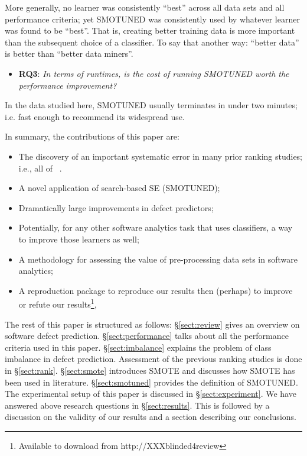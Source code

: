 \documentclass[10pt,conference]{IEEEtran}
\newcommand{\bi}{\begin{itemize}[leftmargin=0.4cm]}
\newcommand{\ei}{\end{itemize}}
\theoremstyle{break}
\theoremstyle{break}
\newcommand{\tion}[1]{{\S}\ref{sect:#1}}
\newcommand{\sma}{{\sc SMOTE}}
\newcommand{\smb}{{\sc SMOTUNED}}
\begin{document}
More generally, no learner was consistently ``best'' across all data sets and all performance criteria; yet {\smb} was consistently  used by  whatever  learner was found to be ``best''.  
That is,  creating better training data is more important
than the subsequent choice of a classifier.  To say that another way: ``better data'' is better than ``better data miners''.
 
  
   \bi
  \item
  \textbf{RQ3}: {\em  In terms of runtimes, is the cost of running {\smb} worth the performance improvement?}
  \ei
  
   \begin{lesson}In the data studied here,
   {\smb} usually terminates in under two minutes; i.e.  fast enough
   to recommend its widespread use.
 \end{lesson}


\newpage
\noindent
In summary, the  contributions of this paper are:
\bi
\item The discovery of an important systematic error in  many prior ranking studies; i.e., all of
~\cite{lessmann2008benchmarking,hall2012systematic,elish2008predicting,menzies2010defect,gondra2008applying,radjenovic2013software,jiang2008techniques,wang2013using,mende2009revisiting,li2012sample,khoshgoftaar2010attribute,jiang2009variance,ghotra2015revisiting,jiang2008can,tantithamthavorn2016automated,fu2016tuning}.
\item A novel application of search-based SE ({\smb});
\item Dramatically large improvements in  defect predictors;
\item Potentially, for any other software analytics task that uses classifiers, a way to improve those learners as well;
\item A methodology for assessing the value of pre-processing data sets in software analytics;
\item A reproduction package to reproduce our results then (perhaps) to improve or refute  our results\footnote{Available to download from http://XXXblinded4review},
\ei
The rest of this paper is structured as follows:
\tion{review} gives an overview on software defect prediction.
\tion{performance} talks about all the performance criteria used in this paper.
\tion{imbalance} explains the problem of class imbalance in defect prediction. Assessment of the previous ranking studies is done in \tion{rank}.
\tion{smote} introduces {\sma} and discusses how {\sma} has been used in literature. \tion{smotuned} provides the definition of {\smb}. The experimental setup of this paper is discussed in \tion{experiment}.
We have answered above research questions in
\tion{results}. This is followed by a discussion on the validity of our results 
and a section describing our conclusions.
 
\end{document}
